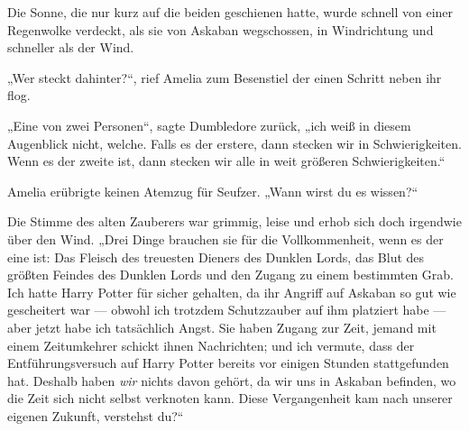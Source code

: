 \later

Die Sonne, die nur kurz auf die beiden geschienen hatte, wurde schnell von einer Regenwolke verdeckt, als sie von Askaban wegschossen, in Windrichtung und schneller als der Wind.

„Wer steckt dahinter?“, rief Amelia zum Besenstiel der einen Schritt neben ihr flog.

„Eine von zwei Personen“, sagte Dumbledore zurück, „ich weiß in diesem Augenblick nicht, welche. Falls es der erstere, dann stecken wir in Schwierigkeiten. Wenn es der zweite ist, dann stecken wir alle in weit größeren Schwierigkeiten.“

Amelia erübrigte keinen Atemzug für Seufzer.
„Wann wirst du es wissen?“

Die Stimme des alten Zauberers war grimmig, leise und erhob sich doch irgendwie über den Wind.
„Drei Dinge brauchen sie für die Vollkommenheit, wenn es der eine ist: Das Fleisch des treuesten Dieners des Dunklen Lords, das Blut des größten Feindes des Dunklen Lords und den Zugang zu einem bestimmten Grab. Ich hatte Harry Potter für sicher gehalten, da ihr Angriff auf Askaban so gut wie gescheitert war — obwohl ich trotzdem Schutzzauber auf ihm platziert habe — aber jetzt habe ich tatsächlich Angst. Sie haben Zugang zur Zeit, jemand mit einem Zeitumkehrer schickt ihnen Nachrichten; und ich vermute, dass der Entführungsversuch auf Harry Potter bereits vor einigen Stunden stattgefunden hat. Deshalb haben \emph{wir} nichts davon gehört, da wir uns in Askaban befinden, wo die Zeit sich nicht selbst verknoten kann. Diese Vergangenheit kam nach unserer eigenen Zukunft, verstehst du?“

